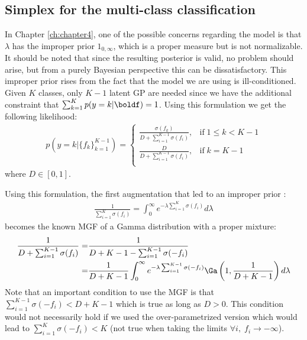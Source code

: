 \subsection{Simplex for the multi-class classification}
\label{sec:simplex}
In Chapter \ref{ch:chapter4}, one of the possible concerns regarding the model is that $\lambda$ has the improper prior $1_{0,\infty}$, which is a proper measure but is not normalizable.
It should be noted that since the resulting posterior is valid, no problem should arise, but from a purely Bayesian perspective this can be dissatisfactory.
This improper prior rises from the fact that the model we are using is ill-conditioned.
Given $K$ classes, only $K-1$ latent \ac{GP} are needed since we have the additional constraint that $\sum_{k=1}^K p(y=k|\boldf) = 1$.
Using this formulation we get the following likelihood:
\begin{align}
    p(y=k|\{f_k\}_{k=1}^{K-1}) = \left\{
        \begin{array}{cc}
            \frac{\sigma(f_k)}{D + \sum_{i=1}^{K-1}\sigma(f_i)}, & \mathrm{if}\; 1 \leq k < K - 1\\
            \frac{D}{D + \sum_{i=1}^{K-1}\sigma(f_i)}, & \mathrm{if}\; k = K - 1 \\
    \end{array}
    \right.
\end{align}
where $D \in [0, 1]$.

Using this formulation, the first augmentation that led to an improper prior :
\begin{align*}
    \frac{1}{ \sum_{i=1}^{K} \sigma(f_i)} = \int_0^\infty e^{-\lambda  \sum_{i=1}^{K} \sigma(f_i)}d\lambda
\end{align*}
becomes the known \ac{MGF} of a Gamma distribution with a proper mixture:
\begin{align*}
    \frac{1}{D + \sum_{i=1}^{K-1} \sigma(f_i)} =& \frac{1}{D + K - 1 - \sum_{i=1}^{K-1} \sigma(-f_i)}\\
    =& \frac{1}{D + K - 1}\int_0^\infty e^{-\lambda \sum_{i=1}^{K-1} \sigma(-f_i)}\Ga \left(1, \frac{1}{D + K - 1}\right)d\lambda
\end{align*}
Note that an important condition to use the \ac{MGF} is that $\sum_{i=1}^{K-1} \sigma(-f_i) < D + K - 1$ which is true as long as $D > 0$.
This condition would not necessarily hold if we used the over-parametrized version which would lead to $\sum_{i=1}^{K} \sigma(-f_i) < K$ (not true when taking the limits $\forall i,\;f_i \rightarrow -\infty$).

